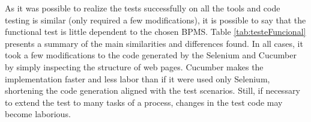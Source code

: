 \documentclass[runningheads,a4paper]{llncs}
\begin{document}

As it was possible to realize the tests successfully on all the tools and code testing is similar (only required a few modifications), it is possible to say that the functional test is little dependent to the chosen BPMS. Table \ref{tab:testeFuncional} presents a summary of the main similarities and differences found. In all cases, it took a few modifications to the code generated by the Selenium and Cucumber by simply inspecting the structure of web pages. Cucumber makes the implementation faster and less labor than if it were used only Selenium, shortening the code generation aligned with the test scenarios. Still, if necessary to extend the test to many tasks of a process, changes in the test code may become laborious.

\end{document}
